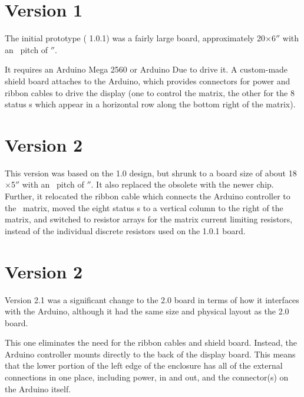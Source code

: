 \section{Version 1}
The initial prototype ( 1.0.1) was a fairly large board, approximately 20$\times$6$''$
with an \led\ pitch of $''$.

It requires an Arduino Mega 2560 or Arduino Due to drive it. A custom-made shield board attaches to
the Arduino, which provides connectors for power and ribbon cables to drive the display (one to control
the matrix, the other for the 8 status \led s which appear in a horizontal row along the bottom
right of the matrix).


\section{Version 2}
This version was based on the 1.0 design, but shrunk to a board size of about 18$\times$5$''$
with an \led\ pitch of $''$. It also replaced the obsolete  with the newer  chip.
Further, it relocated the ribbon cable which connects the Arduino controller to the \led\ matrix, moved the
eight status \led s to a vertical column to the right of the matrix, and switched to resistor arrays
for the matrix current limiting resistors, instead of the individual discrete resistors used on the 1.0.1 board.

\section{Version 2}
Version 2.1 was a significant change to the 2.0 board in terms of how it interfaces with the Arduino, although it had the same size and physical
layout as the 2.0 board.

This one eliminates the need for the ribbon cables and shield board. Instead, the Arduino controller mounts
directly to the back of the display board. This means that the lower portion of the left edge of the enclosure
has all of the external connections in one place, including power,  in and out, and the 
 connector(s) on the Arduino itself.

